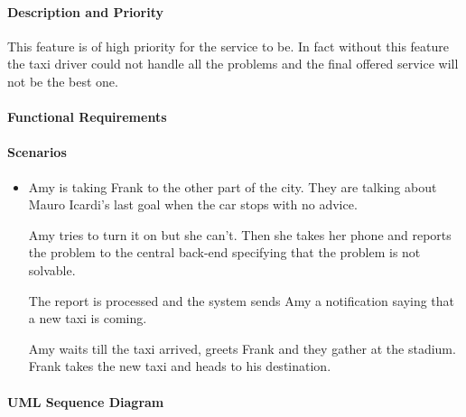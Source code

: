 \paragraph{Description and Priority}
This feature is of high priority for the service to be. In fact without this feature the taxi driver could not handle all the problems and the final offered service will not be the best one.
\paragraph{Functional Requirements}
\begin{itemize}
\end{itemize}
\paragraph{Scenarios}
\begin{itemize}
	\item Amy is taking Frank to the other part of the city. They are talking about Mauro Icardi's last goal when the car stops with no advice. \par Amy tries to turn it on but she can't. Then she takes her phone and reports the problem to the central back-end specifying that the problem is not solvable. \par The report is processed and the system sends Amy a notification saying that a new taxi is coming. \par Amy waits till the taxi arrived, greets Frank and they gather at the stadium. Frank takes the new taxi and heads to his destination.
\end{itemize}
\paragraph{UML Sequence Diagram}
